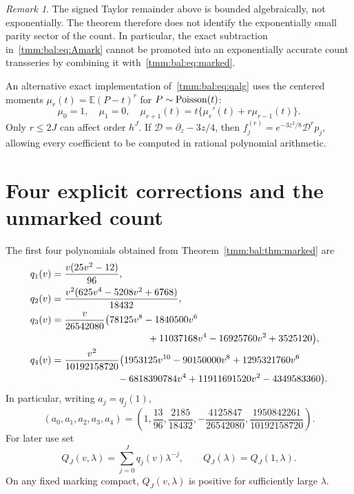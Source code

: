 \documentclass[11pt,letterpaper]{article}
\theoremstyle{remark}\newtheorem{remark}[theorem]{Remark}
\newcommand{\E}{\mathbb E}\newcommand{\Pp}{\mathbb P}
\begin{document}
\begin{remark}\label{tmm:bal:rem:parity}
The signed Taylor remainder above is bounded algebraically, not exponentially. The theorem therefore does not identify the exponentially small parity sector of the count. In particular, the exact subtraction in~\eqref{tmm:bal:eq:Amark} cannot be promoted into an exponentially accurate count transseries by combining it with~\eqref{tmm:bal:eq:marked}.
\end{remark}

An alternative exact implementation of~\eqref{tmm:bal:eq:qalg} uses the centered moments $\mu_r(t)=\E(P-t)^r$ for $P\sim\operatorname{Poisson}(t)$:
\begin{equation}\label{tmm:bal:eq:mu}
 \mu_0=1,\quad\mu_1=0,\quad
 \mu_{r+1}(t)=t\{\mu_r'(t)+r\mu_{r-1}(t)\}.
\end{equation}
Only $r\le2J$ can affect order $h^J$. If $\mathcal D=\partial_z-3z/4$, then $f_j^{(r)}=e^{-3z^2/8}\mathcal D^rp_j$, allowing every coefficient to be computed in rational polynomial arithmetic.

\section{Four explicit corrections and the unmarked count}\label{tmm:bal:sec:coeff}
The first four polynomials obtained from Theorem~\ref{tmm:bal:thm:marked} are
\begin{align}
 q_1(v)&=\frac{v(25v^2-12)}{96},\label{tmm:bal:eq:q1}\\
 q_2(v)&=\frac{v^2(625v^4-5208v^2+6768)}{18432},\label{tmm:bal:eq:q2}\\
 q_3(v)&=\frac{v}{26542080}\bigl(78125v^8-1840500v^6\notag\\
 &\hspace{35mm}+11037168v^4-16925760v^2+3525120\bigr),\label{tmm:bal:eq:q3}\\
 q_4(v)&=\frac{v^2}{10192158720}\bigl(1953125v^{10}-90150000v^8
                   +1295321760v^6\notag\\
 &\hspace{24mm}-6818390784v^4+11911691520v^2-4349583360\bigr).\label{tmm:bal:eq:q4}
\end{align}
In particular, writing $a_j=q_j(1)$,
\begin{equation}\label{tmm:bal:eq:a}
 (a_0,a_1,a_2,a_3,a_4)=
 \left(1,\frac{13}{96},\frac{2185}{18432},
       -\frac{4125847}{26542080},\frac{1950842261}{10192158720}\right).
\end{equation}
For later use set
\begin{equation}\label{tmm:bal:eq:Q}
 Q_J(v,\lambda)=\sum_{j=0}^Jq_j(v)\lambda^{-j},\qquad
 Q_J(\lambda)=Q_J(1,\lambda).
\end{equation}
On any fixed marking compact, $Q_J(v,\lambda)$ is positive for sufficiently large $\lambda$.
\end{document}
